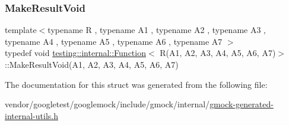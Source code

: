 \subsubsection{\texorpdfstring{Make\+Result\+Void}{MakeResultVoid}}
{\footnotesize\ttfamily template$<$typename R , typename A1 , typename A2 , typename A3 , typename A4 , typename A5 , typename A6 , typename A7 $>$ \\
typedef void \hyperlink{structtesting_1_1internal_1_1_function}{testing\+::internal\+::\+Function}$<$ R(A1, A2, A3, A4, A5, A6, A7)$>$\+::Make\+Result\+Void(A1, A2, A3, A4, A5, A6, A7)}



The documentation for this struct was generated from the following file\+:\begin{DoxyCompactItemize}
\item 
vendor/googletest/googlemock/include/gmock/internal/\hyperlink{gmock-generated-internal-utils_8h}{gmock-\/generated-\/internal-\/utils.\+h}\end{DoxyCompactItemize}
